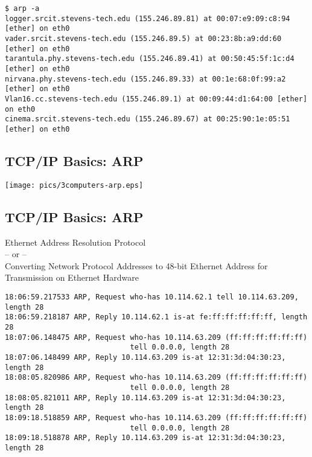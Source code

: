 \documentclass[xga]{xdvislides}
\begin{document}
\begin{verbatim}
$ arp -a
logger.srcit.stevens-tech.edu (155.246.89.81) at 00:07:e9:09:c8:94 [ether] on eth0
vader.srcit.stevens-tech.edu (155.246.89.5) at 00:23:8b:a9:dd:60 [ether] on eth0
tarantula.phy.stevens-tech.edu (155.246.89.41) at 00:50:45:5f:1c:d4 [ether] on eth0
nirvana.phy.stevens-tech.edu (155.246.89.33) at 00:1e:68:0f:99:a2 [ether] on eth0
Vlan16.cc.stevens-tech.edu (155.246.89.1) at 00:09:44:d1:64:00 [ether] on eth0
cinema.srcit.stevens-tech.edu (155.246.89.67) at 00:25:90:1e:05:51 [ether] on eth0
\end{verbatim}

\subsection{TCP/IP Basics: ARP}
\vspace*{\fill}
\begin{center}
	\texttt{[image: pics/3computers-arp.eps]}
\end{center}
\vspace*{\fill}


\subsection{TCP/IP Basics: ARP}
\begin{center}
Ethernet Address Resolution Protocol \\
-- or -- \\
Converting Network Protocol Addresses to 48-bit Ethernet Address for Transmission on Ethernet Hardware
\end{center}
\vspace{.2in}

\begin{verbatim}
18:06:59.217533 ARP, Request who-has 10.114.62.1 tell 10.114.63.209, length 28
18:06:59.218187 ARP, Reply 10.114.62.1 is-at fe:ff:ff:ff:ff:ff, length 28
18:07:06.148475 ARP, Request who-has 10.114.63.209 (ff:ff:ff:ff:ff:ff)
                             tell 0.0.0.0, length 28
18:07:06.148499 ARP, Reply 10.114.63.209 is-at 12:31:3d:04:30:23, length 28
18:08:05.820986 ARP, Request who-has 10.114.63.209 (ff:ff:ff:ff:ff:ff)
                             tell 0.0.0.0, length 28
18:08:05.821011 ARP, Reply 10.114.63.209 is-at 12:31:3d:04:30:23, length 28
18:09:18.518859 ARP, Request who-has 10.114.63.209 (ff:ff:ff:ff:ff:ff)
                             tell 0.0.0.0, length 28
18:09:18.518878 ARP, Reply 10.114.63.209 is-at 12:31:3d:04:30:23, length 28
\end{verbatim}
\end{document}
